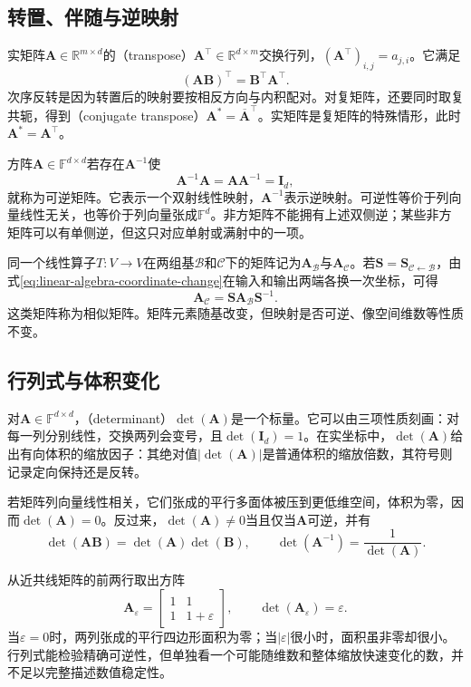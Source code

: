 \subsection{转置、伴随与逆映射}

实矩阵$\bm{A}\in\mathbb{R}^{m\times d}$的（transpose）$\bm{A}^{\top}\in\mathbb{R}^{d\times m}$交换行列，$(\bm{A}^{\top})_{i,j}=a_{j,i}$。它满足
\[
  (\bm{A}\bm{B})^{\top}=\bm{B}^{\top}\bm{A}^{\top}.
\]
次序反转是因为转置后的映射要按相反方向与内积配对。对复矩阵，还要同时取复共轭，得到（conjugate transpose）$\bm{A}^{*}=\overline{\bm{A}}^{\top}$。实矩阵是复矩阵的特殊情形，此时$\bm{A}^{*}=\bm{A}^{\top}$。

方阵$\bm{A}\in\mathbb{F}^{d\times d}$若存在$\bm{A}^{-1}$使
\[
  \bm{A}^{-1}\bm{A}
  =
  \bm{A}\bm{A}^{-1}
  =
  \bm{I}_d,
\]
就称为可逆矩阵。它表示一个双射线性映射，$\bm{A}^{-1}$表示逆映射。可逆性等价于列向量线性无关，也等价于列向量张成$\mathbb{F}^d$。非方矩阵不能拥有上述双侧逆；某些非方矩阵可以有单侧逆，但这只对应单射或满射中的一项。

同一个线性算子$T:V\to V$在两组基$\mathcal{B}$和$\mathcal{C}$下的矩阵记为$\bm{A}_{\mathcal{B}}$与$\bm{A}_{\mathcal{C}}$。若$\bm{S}=\bm{S}_{\mathcal{C}\leftarrow\mathcal{B}}$，由式\eqref{eq:linear-algebra-coordinate-change}在输入和输出两端各换一次坐标，可得
\begin{equation}
  \bm{A}_{\mathcal{C}} = \bm{S}\bm{A}_{\mathcal{B}}\bm{S}^{-1}. \label{eq:linear-algebra-similarity-change-basis}
\end{equation}
这类矩阵称为相似矩阵。矩阵元素随基改变，但映射是否可逆、像空间维数等性质不变。

\subsection{行列式与体积变化}

对$\bm{A}\in\mathbb{F}^{d\times d}$，（determinant）$\det(\bm{A})$是一个标量。它可以由三项性质刻画：对每一列分别线性，交换两列会变号，且$\det(\bm{I}_d)=1$。在实坐标中，$\det(\bm{A})$给出有向体积的缩放因子：其绝对值$|\det(\bm{A})|$是普通体积的缩放倍数，其符号则记录定向保持还是反转。

若矩阵列向量线性相关，它们张成的平行多面体被压到更低维空间，体积为零，因而$\det(\bm{A})=0$。反过来，$\det(\bm{A})\neq0$当且仅当$\bm{A}$可逆，并有
\[
  \det(\bm{A}\bm{B})
  =
  \det(\bm{A})\det(\bm{B}),
  \qquad
  \det(\bm{A}^{-1})
  =
  \frac{1}{\det(\bm{A})}.
\]

从近共线矩阵的前两行取出方阵
\[
  \bm{A}_{\varepsilon}
  =
  \begin{bmatrix} 1&1\\ 1&1+\varepsilon \end{bmatrix},
  \qquad
  \det(\bm{A}_{\varepsilon})=\varepsilon.
\]
当$\varepsilon=0$时，两列张成的平行四边形面积为零；当$|\varepsilon|$很小时，面积虽非零却很小。行列式能检验精确可逆性，但单独看一个可能随维数和整体缩放快速变化的数，并不足以完整描述数值稳定性。

